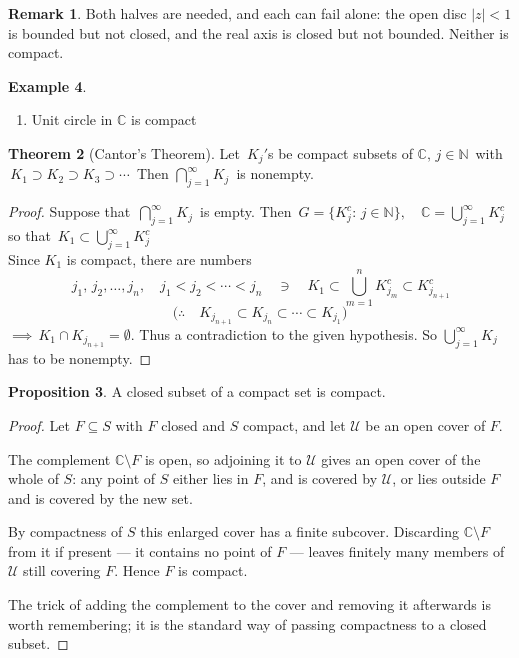 \documentclass[11pt,a4paper]{article}
\theoremstyle{definition}
\newtheorem{thm}{Theorem}[section]
\newtheorem{example}[thm]{Example}
\newtheorem{remark}[thm]{Remark}
\newtheorem{proposition}[thm]{Proposition}
\begin{document}
\begin{remark}
Both halves are needed, and each can fail alone: the open disc
$\left|z\right|<1$ is bounded but not closed, and the real axis is closed but
not bounded. Neither is compact.
\end{remark}

\begin{example}
\begin{enumerate}
\item Unit circle in $\mathbb{C}$ is compact
\end{enumerate}
\vspace{1cm}










\begin{thm}[Cantor's Theorem]
Let $\, K_j'$s be compact subsets of $\mathbb{C},\, j \in \mathbb{N}\,$ with $\, K_1\supset K_2\supset K_3\supset \cdots\,$ Then $\bigcap\limits_{j= 1}^{\infty}K_j\,$ is nonempty.
\end{thm}

\begin{proof}
Suppose that $\, \bigcap\limits^{\infty}_{j = 1} K_j\,$ is empty. Then $\, G = \big\{K^c_j : \, j\in \mathbb{N}\big\},\quad  \mathbb{C} = \bigcup\limits^{\infty}_{j= 1}K^c_j\,$ so that $\,K_1\subset \bigcup\limits^{\infty}_{j = 1} K^c_j$\\
Since $K_1$ is compact, there are numbers $$\, j_1, \, j_2,\ldots, j_n,\quad  j_1< j_2< \cdots < j_n \quad  \ni\quad  K_1 \subset \bigcup\limits^n_{m = 1}K^c_{j_m} \subset K^c_{j_{n+1}}$$
$$\Big(\therefore\quad  K_{j_{n+1}} \subset K_{j_n} \subset \cdots \subset K_{j_1}\Big)$$
$\implies\, K_1 \cap K_{j_{n+1}} = \emptyset$. Thus a contradiction to the given hypothesis. So $\bigcup\limits^{\infty}_{j = 1}K_j\,$ has to be nonempty.
\end{proof}

\begin{proposition}
A closed subset of a compact set is compact.
\end{proposition}

\begin{proof}
Let $F\subseteq S$ with $F$ closed and $S$ compact, and let $\mathcal{U}$ be an
open cover of $F$.

The complement $\mathbb{C}\setminus F$ is open, so adjoining it to
$\mathcal{U}$ gives an open cover of the whole of $S$: any point of $S$ either
lies in $F$, and is covered by $\mathcal{U}$, or lies outside $F$ and is
covered by the new set.

By compactness of $S$ this enlarged cover has a finite subcover. Discarding
$\mathbb{C}\setminus F$ from it if present --- it contains no point of $F$ --- 
leaves finitely many members of $\mathcal{U}$ still covering $F$. Hence $F$ is
compact.

The trick of adding the complement to the cover and removing it afterwards is
worth remembering; it is the standard way of passing compactness to a closed
subset.
\end{proof}
\end{example}
\end{document}
